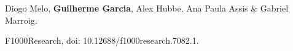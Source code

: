 \documentclass[12pt,twoside]{report}
\begin{document}
Diogo Melo, \textbf{Guilherme Garcia}, Alex Hubbe, Ana Paula Assis \& Gabriel Marroig.  

F1000Research, doi: 10.12688/f1000research.7082.1.








\end{document}
